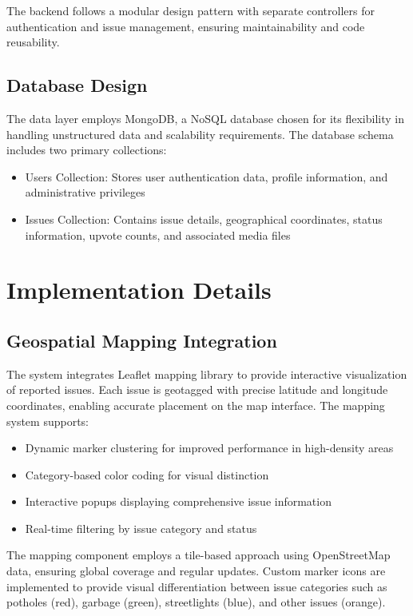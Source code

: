 \documentclass[journal,10pt,twocolumn]{IEEEtran}
\begin{document}
The backend follows a modular design pattern with separate controllers for authentication and issue management, ensuring maintainability and code reusability.

\subsection{Database Design}
The data layer employs MongoDB, a NoSQL database chosen for its flexibility in handling unstructured data and scalability requirements. The database schema includes two primary collections:

\begin{itemize}
\item Users Collection: Stores user authentication data, profile information, and administrative privileges
\item Issues Collection: Contains issue details, geographical coordinates, status information, upvote counts, and associated media files
\end{itemize}

\section{Implementation Details}
\subsection{Geospatial Mapping Integration}
The system integrates Leaflet mapping library to provide interactive visualization of reported issues. Each issue is geotagged with precise latitude and longitude coordinates, enabling accurate placement on the map interface. The mapping system supports:

\begin{itemize}
\item Dynamic marker clustering for improved performance in high-density areas
\item Category-based color coding for visual distinction
\item Interactive popups displaying comprehensive issue information
\item Real-time filtering by issue category and status
\end{itemize}

The mapping component employs a tile-based approach using OpenStreetMap data, ensuring global coverage and regular updates. Custom marker icons are implemented to provide visual differentiation between issue categories such as potholes (red), garbage (green), streetlights (blue), and other issues (orange).
\end{document}
